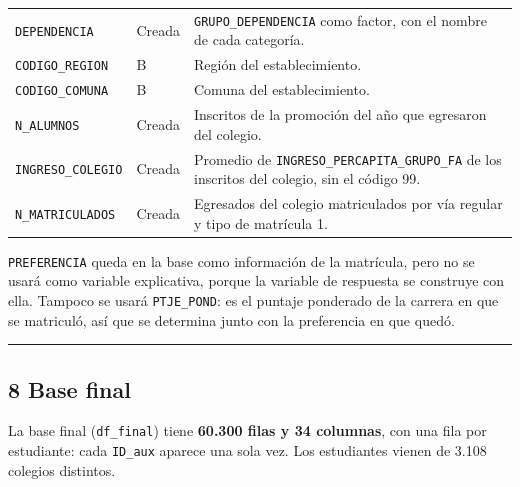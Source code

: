 \documentclass[11pt]{article}
\begin{document}
\begin{longtable}{>{\raggedright\arraybackslash}p{5.4cm}
                  >{\raggedright\arraybackslash}p{1.4cm}
                  >{\raggedright\arraybackslash}p{6.6cm}}
\texttt{DEPENDENCIA} & Creada & \texttt{GRUPO\_DEPENDENCIA} como factor, con el nombre de cada categoría. \\
\texttt{CODIGO\_REGION} & B & Región del establecimiento. \\
\texttt{CODIGO\_COMUNA} & B & Comuna del establecimiento. \\
\texttt{N\_ALUMNOS} & Creada & Inscritos de la promoción del año que egresaron del colegio. \\
\texttt{INGRESO\_COLEGIO} & Creada & Promedio de \texttt{INGRESO\_PERCAPITA\_GRUPO\_FA} de los inscritos del colegio, sin el código 99. \\
\texttt{N\_MATRICULADOS} & Creada & Egresados del colegio matriculados por vía regular y tipo de matrícula 1. \\
\end{longtable}

\texttt{PREFERENCIA} queda en la base como información de la matrícula,
pero no se usará como variable explicativa, porque la variable de
respuesta se construye con ella. Tampoco se usará \texttt{PTJE\_POND}:
es el puntaje ponderado de la carrera en que se matriculó, así que se
determina junto con la preferencia en que quedó.

\medskip\hrule\medskip

\subsection*{8 \; Base final}

La base final (\texttt{df\_final}) tiene \textbf{60.300 filas y 34
columnas}, con una fila por estudiante: cada \texttt{ID\_aux} aparece una
sola vez. Los estudiantes vienen de 3.108 colegios distintos.
\end{document}
